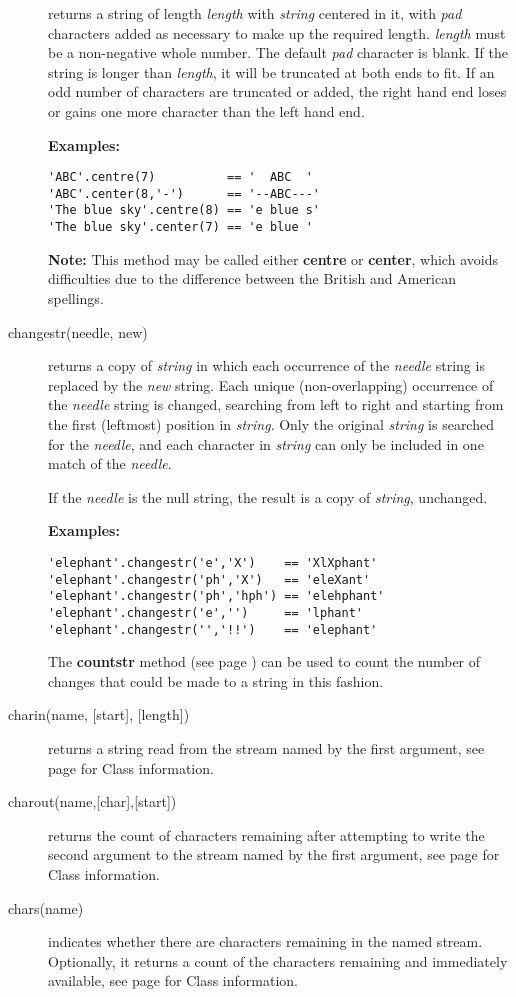 \begin{description}
returns a string of length \emph{length} with \emph{string}
centered in it, with \emph{pad} characters added as necessary to
make up the required length.
\emph{length} must be a non-negative whole number.
The default \emph{pad} character is blank.
If the string is longer than \emph{length}, it will be truncated at
both ends to fit.
If an odd number of characters are truncated or added, the right hand
end loses or gains one more character than the left hand end.
 
\textbf{Examples:}
\begin{lstlisting}
'ABC'.centre(7)          == '  ABC  '
'ABC'.center(8,'-')      == '--ABC---'
'The blue sky'.centre(8) == 'e blue s'
'The blue sky'.center(7) == 'e blue '
\end{lstlisting}
\textbf{Note: }This method may be called either \textbf{centre} or \textbf{center},
which avoids difficulties due to the difference between the British and
American spellings.
\item[changestr(needle, new)]\label{refchastr}

returns a copy of \emph{string} in which each occurrence of the
\emph{needle} string is replaced by the \emph{new} string.
Each unique (non-overlapping) occurrence of the \emph{needle} string
is changed, searching from left to right and starting from the first
(leftmost) position in \emph{string}.
Only the original \emph{string} is searched for the
\emph{needle}, and each character in \emph{string} can only be
included in one match of the \emph{needle}.
 
If the \emph{needle} is the null string, the result is a copy of
\emph{string}, unchanged.
 
\textbf{Examples:}
\begin{lstlisting}
'elephant'.changestr('e','X')    == 'XlXphant'
'elephant'.changestr('ph','X')   == 'eleXant'
'elephant'.changestr('ph','hph') == 'elehphant'
'elephant'.changestr('e','')     == 'lphant'
'elephant'.changestr('','!!')    == 'elephant'
\end{lstlisting}
 The  \textbf{countstr} method (see page \pageref{refcoustr})  can be used to
count the number of changes that could be made to a string in this
fashion.
\item[charin(name, [start{]}, [length{]})] returns a string read from the stream named by the first
argument, see page \pageref{refrexxstream} for Class  information.
\item[charout(name,[char{]},[start{]})] returns the count of characters remaining after attempting to
write the second argument to the stream named by the first argument,
see page \pageref{refrexxstream} for Class 
information.
\item[chars(name)] indicates whether there are characters remaining in the named
stream. Optionally, it returns a count of the characters remaining and
immediately available, see page \pageref{refrexxstream} for Class  information.


\end{description}
